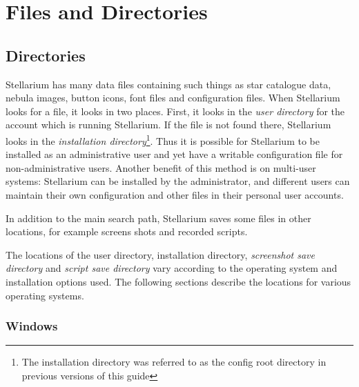 \chapter{Files and Directories}
\label{sec:FilesAndDirectories}

\section{Directories}
\label{sec:Directories}

Stellarium has many data files containing such things as star catalogue
data, nebula images, button icons, font files and configuration files.
When Stellarium looks for a file, it looks in two places. First, it
looks in the \emph{user directory} for the account which is running
Stellarium. If the file is not found there, Stellarium looks in the
\emph{installation directory}\footnote{The installation directory was
  referred to as the config root directory in previous versions of this
  guide}. Thus it is possible for Stellarium to be installed as an
administrative user and yet have a writable configuration file for
non-administrative users. Another benefit of this method is on
multi-user systems: Stellarium can be installed by the administrator,
and different users can maintain their own configuration and other files
in their personal user accounts.

In addition to the main search path, Stellarium saves some files in
other locations, for example screens shots and recorded scripts.

The locations of the user directory, installation directory,
\emph{screenshot save directory} and \emph{script save directory} vary
according to the operating system and installation options used. The
following sections describe the locations for various operating systems.

\subsection{Windows}
\label{sec:FilesAndDirectories:Windows}

